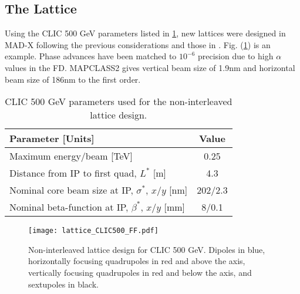 \subsection{The Lattice}
Using the CLIC 500 GeV parameters listed in \ref{t:CLIC500GeVnoninterleaved}, new lattices were designed in MAD-X \cite{MADX} following the previous considerations and those in \cite{Seryi-Raimondi2}. Fig. (\ref{f:MAD-X}) is an example. Phase advances have been matched to $10^{-6}$ precision due to high $\alpha$ values in the FD. MAPCLASS2 \cite{Mapclassorig,Mapclass,Mapclass2,githubMapClass2} gives vertical beam size of 1.9nm and horizontal beam size of 186nm to the first order.\par
\begin{table}[!htb]
\centering
 \begin{tabular}{|l|c|}\hline
  \textbf{Parameter [Units]} & \textbf{Value}\\\hline
  Maximum energy/beam [TeV] & 0.25\\
  Distance from IP to first quad, $L^*$ [m] & 4.3\\
  Nominal core beam size at IP, $\sigma^*$, $x/y$ [nm] & 202/2.3\\
  Nominal beta-function at IP, $\beta^*$, $x/y$ [mm] & 8/0.1\\\hline
 \end{tabular}\caption{CLIC 500 GeV parameters used for the non-interleaved lattice design.}\label{t:CLIC500GeVnoninterleaved}
\end{table}
\begin{figure}[!htb]
   \centering
   \hspace*{-0.6cm}
   \texttt{[image: lattice\_CLIC500\_FF.pdf]}
   \caption{Non-interleaved lattice design for CLIC 500 GeV. Dipoles in blue, horizontally focusing quadrupoles in red and above the axis, vertically focusing quadrupoles in red and below the axis, and sextupoles in black.}
   \label{f:MAD-X}
\end{figure}
